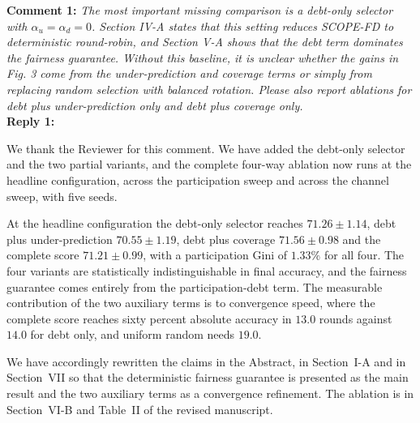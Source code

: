\documentclass[10pt]{article}
\begin{document}

\noindent
\textbf{Comment 1:} \textit{The most important missing comparison is a debt-only selector with $\alpha_u = \alpha_d = 0$. Section IV-A states that this setting reduces SCOPE-FD to deterministic round-robin, and Section V-A shows that the debt term dominates the fairness guarantee. Without this baseline, it is unclear whether the gains in Fig. 3 come from the under-prediction and coverage terms or simply from replacing random selection with balanced rotation. Please also report ablations for debt plus under-prediction only and debt plus coverage only.} \\
\noindent
\textbf{Reply 1:} {We thank the Reviewer for this comment. We have added the debt-only selector and the two partial variants, and the complete four-way ablation now runs at the headline configuration, across the participation sweep and across the channel sweep, with five seeds.

At the headline configuration the debt-only selector reaches $71.26 \pm 1.14$, debt plus under-prediction $70.55 \pm 1.19$, debt plus coverage $71.56 \pm 0.98$ and the complete score $71.21 \pm 0.99$, with a participation Gini of $1.33\%$ for all four. The four variants are statistically indistinguishable in final accuracy, and the fairness guarantee comes entirely from the participation-debt term. The measurable contribution of the two auxiliary terms is to convergence speed, where the complete score reaches sixty percent absolute accuracy in $13.0$ rounds against $14.0$ for debt only, and uniform random needs $19.0$.

We have accordingly rewritten the claims in the Abstract, in Section~I-A and in Section~VII so that the deterministic fairness guarantee is presented as the main result and the two auxiliary terms as a convergence refinement. The ablation is in Section~VI-B and Table~II of the revised manuscript.}\\
\end{document}
